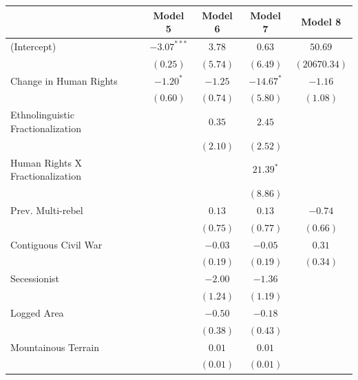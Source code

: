 \documentclass[12pt,]{book}
\let\origtable\table
\let\endorigtable\endtable
\renewenvironment{table}[1][2] {
    \singlespacing
    \expandafter\origtable\expandafter[H]
} {
    \endorigtable
}
\theoremstyle{definition}
\theoremstyle{definition}
\theoremstyle{definition}
\theoremstyle{remark}
\begin{document}
\begin{table}
\begin{center}
\begin{tabular}{l c c c c }
\hline
 & Model 5 & Model 6 & Model 7 & Model 8 \\
\hline
(Intercept)                       & $-3.07^{***}$ & $3.78$   & $0.63$       & $50.69$      \\
                                  & $(0.25)$      & $(5.74)$ & $(6.49)$     & $(20670.34)$ \\
Change in Human Rights            & $-1.20^{*}$   & $-1.25$  & $-14.67^{*}$ & $-1.16$      \\
                                  & $(0.60)$      & $(0.74)$ & $(5.80)$     & $(1.08)$     \\
Ethnolinguistic Fractionalization &               & $0.35$   & $2.45$       &              \\
                                  &               & $(2.10)$ & $(2.52)$     &              \\
Human Rights X Fractionalization  &               &          & $21.39^{*}$  &              \\
                                  &               &          & $(8.86)$     &              \\
Prev. Multi-rebel                 &               & $0.13$   & $0.13$       & $-0.74$      \\
                                  &               & $(0.75)$ & $(0.77)$     & $(0.66)$     \\
Contiguous Civil War              &               & $-0.03$  & $-0.05$      & $0.31$       \\
                                  &               & $(0.19)$ & $(0.19)$     & $(0.34)$     \\
Secessionist                      &               & $-2.00$  & $-1.36$      &              \\
                                  &               & $(1.24)$ & $(1.19)$     &              \\
Logged Area                       &               & $-0.50$  & $-0.18$      &              \\
                                  &               & $(0.38)$ & $(0.43)$     &              \\
Mountainous Terrain               &               & $0.01$   & $0.01$       &              \\
                                  &               & $(0.01)$ & $(0.01)$     &              \\

\end{tabular}
\end{center}
\end{table}
\end{document}
